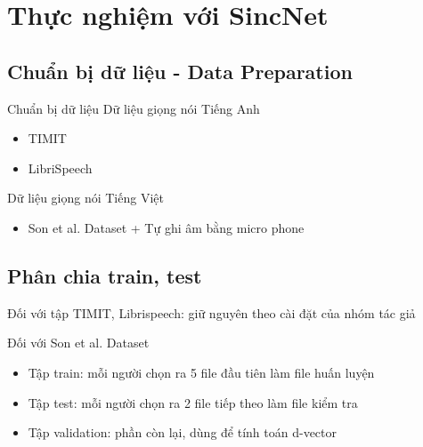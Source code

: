 \documentclass[notheorems, aspectratio=54]{beamer}
\begin{document}
\section{Thực nghiệm với SincNet}
\subsection{Chuẩn bị dữ liệu - Data Preparation}
\begin{frame}{Chuẩn bị dữ liệu}
	Dữ liệu giọng nói Tiếng Anh
	\begin{itemize}
		\item TIMIT
		\item LibriSpeech
	\end{itemize}
	Dữ liệu giọng nói Tiếng Việt
	\begin{itemize}
		\item Son et al. Dataset + Tự ghi âm bằng micro phone
	\end{itemize}
\end{frame}
\subsection{Phân chia train, test}
\begin{frame}
	Đối với tập TIMIT, Librispeech:  giữ nguyên theo cài đặt của nhóm tác giả
	
	Đối với Son et al. Dataset
	\begin{itemize}
		\item Tập train: mỗi người chọn ra 5 file đầu tiên làm file huấn luyện
		\item Tập test: mỗi người chọn ra 2 file tiếp theo làm file kiểm tra
		\item Tập validation: phần còn lại, dùng để tính toán d-vector
	\end{itemize}
\end{frame}
\end{document}
